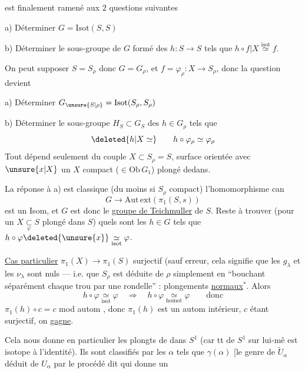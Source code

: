 
est finalement ramené aux $2$ questions suivantes

a) Déterminer $G=\mathrm{Isot}(S,S)$

b) Déterminer le sous-groupe  de $G$ formé des $h:S\longrightarrow S$ tels que $h\circ f|X\overset{\mathrm{isot}}{\simeq}f$.

On peut  supposer $S=S_\rho$ donc $G=G_\rho$, et $f=\varphi_\rho:X\longrightarrow S_\rho$, donc la question devient

a) Déterminer $G_{\unsure{S|\rho}}=\mathrm{Isot}(S_\rho,S_\rho)$ 

b) Déterminer le sous-groupe $H_S\subset G_S$ des $h\in G_\rho$ tels que
\[
 \deleted{h|X\simeq}\qquad h\circ\varphi_\rho\simeq\varphi_\rho
\]
Tout dépend seulement du couple $X\subset S_\rho=S$,  surface orientée avec $\unsure{x|X}$  un $X$ compact ($\in\mathrm{Ob}\,G_1$) plongé dedans.

La réponse à a) est classique (du moins si $S_\rho$ compact)  l'homomorphisme can
\[
 G\longrightarrow\mathrm{Aut\,ext}(\pi_1(S,s))
\]
est un Isom, et $G$ est donc le \uline{groupe de Teichmuller} de  $S$. Reste à trouver (pour un $X\underset{\varphi}{\subset} S$ plongé dans $S$) quels sont les $h\in G$ tels que $h\circ\varphi\deleted{\unsure{x}}\underset{\mathrm{isot}}{\simeq}\varphi$.

\uline{Cas particulier}  $\pi_1(X)\longrightarrow\pi_1(S)$ surjectif (sauf erreur, cela signifie  que les $g_\lambda$ et les $\nu_\lambda$ sont nuls --- i.e. que $S_\rho$ est déduite de $\rho$ simplement en ``bouchant séparément chaque trou par une rondelle'' : plongements \uline{normaux}$^*$. Alors
\[
 h\circ\varphi\underset{\mathrm{isot}}{\simeq}\varphi\quad\Longrightarrow\quad
 h\circ\varphi\underset{\mathrm{homot}}{\simeq}\varphi\qquad\text{donc}
\]
$\pi_1(h)\circ c=c$ mod autom , donc $\pi_1(h)$ est un autom intérieur, $c$ étant surjectif, on \uline{gagne}.

Cela nous donne en particulier les plongts de  dans $S^1$ (car tt   de $S^1$ sur lui-mê est isotope à l'identité). Ils sont classifiés par les $\alpha$ tels que $\gamma(\alpha)$ [le genre de $\widetilde U_\alpha$ déduit de $U_\alpha$ par le procédé dit qui donne  un
